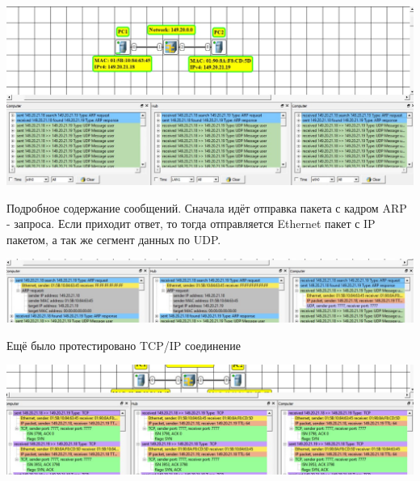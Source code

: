 \documentclass{article}
\begin{document}
\begin{center}
    \includegraphics[width=.9\textwidth]{conc-4.jpg}
\end{center}
Подробное содержание сообщений. Сначала идёт отправка пакета с кадром ARP - запроса. Если приходит ответ, то тогда отправляется Ethernet пакет с IP пакетом, а так же сегмент данных по UDP.


\begin{center}
    \includegraphics[width=.9\textwidth]{conc-5.jpg}
\end{center}

Ещё было протестировано TCP/IP соединение

\begin{center}
    \includegraphics[width=.9\textwidth]{conc-8.jpg}
\end{center}
\end{document}
